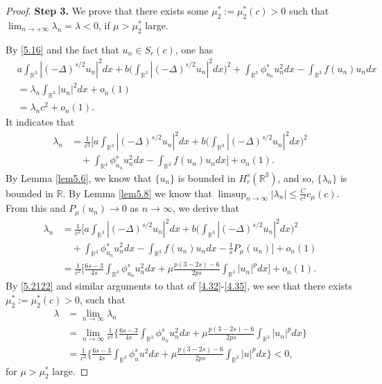 \begin{proof}
\noindent\textbf{Step 3.}
We prove that there exists some $\mu^*_2:=\mu^*_2(c)>0$ such that 
$\lim_{n\to +\infty}\lambda_n=\lambda<0$, if $\mu> \mu^*_2$ large.

By \eqref{5.16} and the fact that $u_n\in S_{r}(c)$, one has
\begin{align*}
&a\int_{\mathbb{R}^3}|(-\Delta)^{s/2}u_n|^2dx
 +b\Big(\int_{\mathbb{R}^3}|(-\Delta)^{s/2}u_n|^2dx\Big)^2
+\int_{\mathbb{R}^3}\phi^s_{u_n} u^2_ndx-\int_{\mathbb{R}^3}f(u_n)u_ndx\\
&= \lambda_n \int_{\mathbb{R}^3}|u_n|^2dx+o_n(1)\\
&= \lambda_n c^2+o_n(1).
\end{align*}
It indicates that
\begin{align*}
\lambda_n
&= \frac{1}{ c^2}\Big[a\int_{\mathbb{R}^3}|(-\Delta)^{s/2}u_n|^2dx
+b\Big(\int_{\mathbb{R}^3}|(-\Delta)^{s/2}u_n|^2dx\Big)^2\\
&\quad +\int_{\mathbb{R}^3}\phi^s_{u_n} u^2_ndx
 -\int_{\mathbb{R}^3}f(u_n)u_ndx\Big]+o_n(1).
\end{align*}
By Lemma \ref{lem5.6}, we  know that $\{u_n\}$ is bounded in $H^s_r(\mathbb{R}^3)$, 
and so, $\{\lambda_n\}$ is bounded in $\mathbb{R}$. 
By Lemma {\ref{lem5.8}} we know that 
$\limsup_{n\to \infty}|\lambda_n|\leq \frac{C}{c^2}c_\mu(c)$. 
From this and  $P_\mu(u_n)\to 0$ as $n\to \infty$, we derive that
\begin{align*}
\lambda_n
&= \frac{1}{ c^2}\Big[a\int_{\mathbb{R}^3}|(-\Delta)^{s/2}u_n|^2dx
 +b\Big(\int_{\mathbb{R}^3}|(-\Delta)^{s/2}u_n|^2dx\Big)^2\\
&\quad +\int_{\mathbb{R}^3}\phi^s_{u_n} u^2_ndx
 -\int_{\mathbb{R}^3}f(u_n)u_ndx-\frac{1}{s}P_\mu(u_n)\Big]+o_n(1)\\
&= \frac{1}{c^2}\Big[\frac{6s-3}{4s}\int_{\mathbb{R}^3}\phi^s_{u_n} u^2_ndx
 +\mu \frac{p(3-2s)-6}{2ps}\int_{\mathbb{R}^3}|u_n|^pdx\Big]+o_n(1).
\end{align*}
By \eqref{5.2122} and similar arguments to that of \eqref{4.32}-\eqref{4.35}, 
we see that there exists $\mu^*_2:=\mu^*_2(c)>0$, such that
\begin{equation}\label{5.212}
\begin{split}
\lambda&= \lim_{n\to \infty}\lambda_n\\
&= \lim_{n\to \infty} \frac{1}{c^2} \Big\{\frac{6s-3}{4s}
 \int_{\mathbb{R}^3}\phi^s_{u_n} u^2_ndx
 +\mu \frac{p(3-2s)-6}{2ps}\int_{\mathbb{R}^3}|u_n|^pdx\Big\}\\
&= \frac{1}{c^2} \Big\{\frac{6s-3}{4s}\int_{\mathbb{R}^3}\phi^s_{u} u^2dx
 +\mu \frac{p(3-2s)-6}{2ps}\int_{\mathbb{R}^3}|u|^pdx\Big\}
< 0,
\end{split}
\end{equation}
for $\mu>\mu^*_2$ large.


\end{proof}
